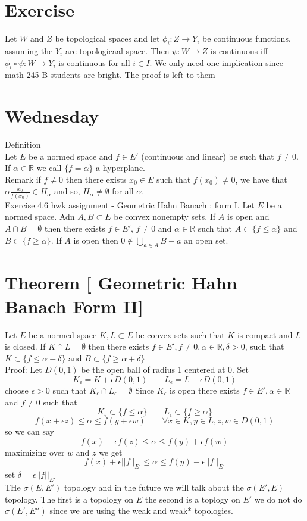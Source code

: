 \documentclass[11pt]{article}
\begin{document}
\section{Exercise}
Let $W$ and  $Z$ be topological spaces and let $\phi_i : Z \rightarrow Y_i$ be continuous functions, assuming the $Y_i$ are topologicaal space.
Then  $\psi : W \rightarrow Z$ is continuous iff $\phi_i \circ \psi : W \rightarrow Y_i$ is continuous for all $i \in I$.
We only need one implication since math 245 B students are bright. The proof is left to them

\section{Wednesday}
Definition\\
Let  $E$ be a normed space and $f \in E'$ (continuous and linear) be such that   $f \ne 0$. If
$\alpha \in \mathbb{R}$ we call  $\{f = \alpha\}$ a hyperplane.\\ 
Remark if $f \ne 0$ then there exists $x_0 \in E$ such that $f(x_0) \ne 0$, we have that
$\alpha \frac{x_0}{f(x_0)} \in H_{\alpha}$ and so, $H_\alpha \ne \emptyset$ for all $\alpha$.
\\
Exercise 4.6 hwk assignment - Geometric Hahn Banach : form I. Let $E$ be a normed space.
Adn $A, B \subset E$ be convex nonempty sets. If $A$ is open and $A \cap B = \emptyset$ then there exists $f \in E'$,  $f \ne 0$ and  $\alpha \in \mathbb{R}$ such that
$A \subset \{f \le \alpha\}$ and $B \subset \{f \ge \alpha\}$. If $A$ is open then $0 \not\in \bigcup_{a \in A} B-a$ an open set.

\section{Theorem [ Geometric Hahn Banach Form II]} Let $E$ be a normed space
$K, L \subset E$ be convex sets such that $K$ is compact and $L$ is closed. If $K \cap L = \emptyset$ then there exists  $f \in E', f \ne 0, \alpha \in \mathbb{R}, \delta > 0$, such that
$K \subset \{f \le \alpha - \delta\}$ and $B \subset \{f \ge \alpha + \delta\}$ \\
Proof: Let $D(0,1)$ be the open ball of radius 1 centered at 0. Set
 \[
     K_{\epsilon} = K + \epsilon D(0,1)  \qquad L_\epsilon = L + \epsilon D(0,1)
\] 
choose $\epsilon > 0$ such that $K_{\epsilon} \cap L_{\epsilon} = \emptyset$ Since $K_{\epsilon} $ is open there exists $f \in E', \alpha \in \mathbb{R}$ and $f \ne 0$ such that
\[
    K_{\epsilon} \subset \{f \le \alpha\} \qquad L_{\epsilon} \subset \{f \ge \alpha\}
\] 
\[
f(x + \epsilon z) \le \alpha \le f(y + \epsilon w) \qquad \forall x \in K, y \in L, z,w \in D(0,1)
\] 
so we can say
\[
f(x) + \epsilon f(z) \le \alpha \le f(y) + \epsilon f(w)
\] 
maximizing over $w$ and $z$ we get
\[
    f(x) + \epsilon ||f||_{E'} \le \alpha \le f(y) - \epsilon ||f||_{E'}
\] 
set $\delta = \epsilon ||f||_{E'}$ 
\\
THe $\sigma(E, E')$ topology and in the future we will talk about the $\sigma(E', E)$ topology. The first is a topology on $E$ the second is a toplogy on $E'$ we do not do  $\sigma(E', E'')$ since we are using the weak and weak* topologies.
\end{document}
